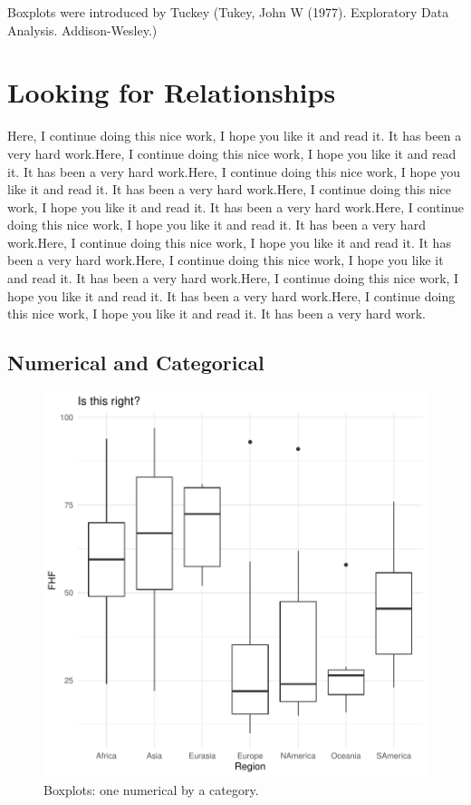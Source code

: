 \documentclass[11pt]{article}
\begin{document}
Boxplots were introduced by Tuckey (Tukey, John W (1977). Exploratory Data Analysis. Addison-Wesley.)


\section{Looking for Relationships}\label{bivar}


Here, I continue doing this nice work, I hope you like it and read it. It has been a very hard work.Here, I continue doing this nice work, I hope you like it and read it. It has been a very hard work.Here, I continue doing this nice work, I hope you like it and read it. It has been a very hard work.Here, I continue doing this nice work, I hope you like it and read it. It has been a very hard work.Here, I continue doing this nice work, I hope you like it and read it. It has been a very hard work.Here, I continue doing this nice work, I hope you like it and read it. It has been a very hard work.Here, I continue doing this nice work, I hope you like it and read it. It has been a very hard work.Here, I continue doing this nice work, I hope you like it and read it. It has been a very hard work.Here, I continue doing this nice work, I hope you like it and read it. It has been a very hard work.

\subsection{Numerical and  Categorical}\label{binumcat}



\begin{figure}[h]
\centering
\begin{adjustbox}{width=7cm,height=7cm} 
\includegraphics{PaperInR_7-numcat_plot}
\end{adjustbox}
\caption{Boxplots: one numerical by a category.}  
\label{numcat_plot} 
\end{figure}
\end{document}
